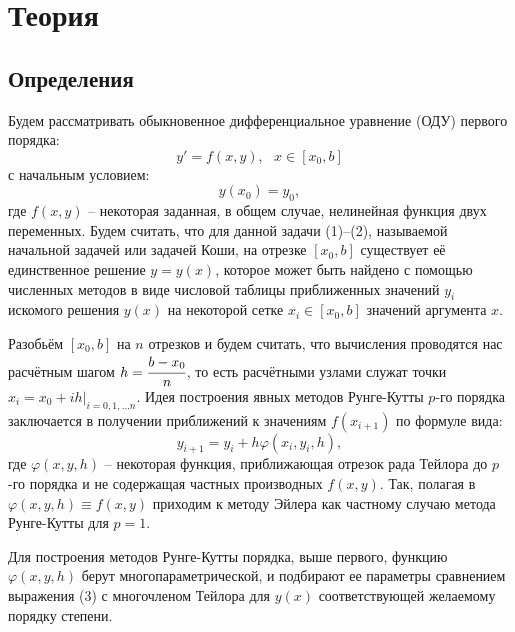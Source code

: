 \section{Теория}

\subsection{Определения}

Будем рассматривать обыкновенное дифференциальное уравнение (ОДУ) первого порядка:
\begin{equation}
    y'=f(x,y), ~~~ x \in [x_0, b]
\end{equation}
с начальным условием:
\begin{equation}
    y(x_0) = y_0,
\end{equation}
где $f(x,y)$ -- некоторая заданная, в общем случае, нелинейная функция двух переменных. Будем считать, что для данной задачи (1)--(2), называемой начальной задачей или задачей Коши, на отрезке $[x_0, b]$ существует её единственное решение $y = y(x)$, которое может быть найдено с помощью численных методов в виде числовой таблицы приближенных значений $y_i$ искомого решения $y(x)$ на некоторой сетке $x_i \in [x_0, b]$ значений аргумента $x$.

Разобьём $[x_0, b]$ на $n$ отрезков и будем считать, что вычисления проводятся нас расчётным шагом $h=\cfrac{b-x_0}{n}$, то есть расчётными узлами служат точки $x_i=x_0 + ih|_{i=0,1,\ldots n}$. Идея построения явных методов Рунге-Кутты $p$-го порядка заключается в получении приближений к значениям $f(x_{i+1})$ по формуле вида:
\begin{equation}
    y_{i+1} = y_i + h\varphi(x_i, y_i, h),
\end{equation}
где $\varphi(x,y,h)$ -- некоторая функция, приближающая отрезок рада Тейлора до $p$-го порядка и не содержащая частных производных $f(x,y)$. Так, полагая в $\varphi(x,y,h) \equiv f(x,y)$ приходим к методу Эйлера как частному случаю метода Рунге-Кутты для $p=1$.

Для построения методов Рунге-Кутты порядка, выше первого, функцию $\varphi(x,y,h)$ берут многопараметрической, и подбирают ее параметры сравнением выражения (3) с многочленом Тейлора для $y(x)$ соответствующей желаемому порядку степени.

